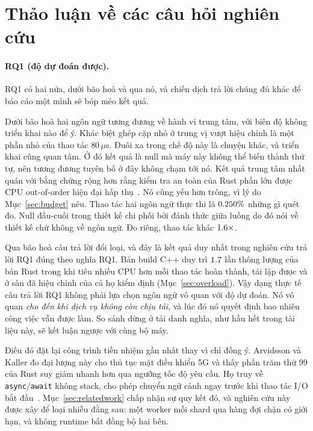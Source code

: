 \section{Thảo luận về các câu hỏi nghiên cứu}\label{sec:rqdiscussion}
\paragraph{RQ1 (độ dự đoán được).} RQ1 có hai nửa, dưới bão hoà và qua nó, và
chiến dịch trả lời chúng đủ khác để báo cáo một mình sẽ bóp méo
kết quả.

Dưới bão hoà hai ngôn ngữ tương đương về hành vi trung tâm, với biên độ không triển khai
nào để ý. Khác biệt ghép cặp nhỏ ở trung vị vượt hiệu chỉnh là
một phần nhỏ của thao tác $80\,\mu$s. Đuôi xa trong chế độ này là chuyện khác, và triển khai
cũng quan tâm. Ở đó kết quả là null mà máy này không thể biến thành
thứ tự, nên tương đương tuyên bố ở đây không chạm tới nó. Kết quả trung tâm nhất quán với
bằng chứng rộng hơn rằng
kiểm tra an toàn của Rust phần lớn được CPU out-of-order hiện đại
hấp thụ~\cite{balasubramanian2017rust,emmerich2019drivers}. Nó cũng yếu hơn
trông, vì lý do Mục~\ref{sec:budget} nêu. Thao tác hai ngôn ngữ
thực thi là $0.250\%$ những gì quét đo. Null đầu-cuối trong
thiết kế chi phối bởi đánh thức giữa luồng do đó nói về thiết kế chứ không
về ngôn ngữ. Đo riêng, thao tác khác $1.6\times$.

Qua bão hoà câu trả lời đổi loại, và đây là kết quả duy nhất trong nghiên cứu trả lời
RQ1 đúng theo nghĩa RQ1. Bản build C++ duy trì $1.7$ lần thông lượng của
bản Rust trong khi tiêu nhiều CPU hơn mỗi thao tác hoàn thành, tái lập được và ở sàn
đã hiệu chỉnh của cả họ kiểm định (Mục~\ref{sec:overload}). Vậy dạng thực tế câu trả lời RQ1
không phải lựa chọn ngôn ngữ vô quan với độ dự đoán. Nó vô quan \emph{cho đến khi
dịch vụ không còn chịu tải}, và lúc đó nó quyết định bao nhiêu
công việc vẫn được làm. So sánh dừng ở tải danh nghĩa, như hầu hết trong tài liệu
này, sẽ kết luận ngược với cùng bộ máy.

Điều đó đặt lại công trình tiền nhiệm gần nhất thay vì chỉ đồng ý. Arvidsson và Kaller
đo đại lượng này cho thủ tục mặt điều khiển 5G và thấy phần trăm thứ 99 của Rust suy giảm
nhanh hơn qua ngưỡng tốc độ yêu cầu. Họ truy về
\texttt{async}/\texttt{await} không stack, cho phép chuyển ngữ cảnh ngay trước khi thao tác I/O
bắt đầu~\cite{arvidsson2025async}. Mục~\ref{sec:relatedwork} chấp nhận sự quy kết đó, và
nghiên cứu này được xây để loại nhiễu đằng sau: một worker mỗi shard qua hàng đợi chặn có giới hạn,
và không runtime bất đồng bộ hai bên.

